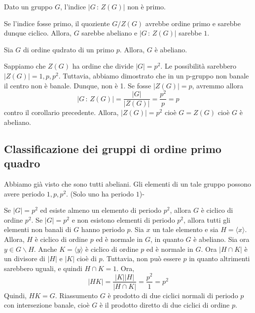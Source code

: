 \documentclass[a4paper]{article}
\begin{document}
\begin{snippetcorollary}{}
    Dato un gruppo \(G\), l'indice %
    \(|G\,:\,Z(G)|\) non è primo.
\end{snippetcorollary}

\begin{snippetproof}{}
    Se l'indice fosse primo, il quoziente \(G /Z(G)\) avrebbe ordine primo e sarebbe dunque ciclico.
    Allora, \(G\) sarebbe abeliano e \(|G\,:\,Z(G)|\) sarebbe \(1\).
\end{snippetproof}

\begin{snippetcorollary}{}
    Sia \(G\) di ordine qudrato di un primo \(p\).
    Allora, \(G\) è abeliano.
\end{snippetcorollary}

\begin{snippetproof}{}
    Sappiamo che \(Z(G)\) ha ordine che divide \(|G| = p^2\).
    Le possibilità sarebbero \(|Z(G)| = 1,p, p^2\).
    Tuttavia, abbiamo dimostrato che in un p-gruppo non banale
    il centro non è banale.
    Dunque, non è 1.
    Se fosse \(|Z(G)| = p\), avremmo allora
    \[
        |G\,:\, Z(G)| = \frac{|G|}{|Z(G)|} = \frac{p^2}{p} =p
    \]
    contro il corollario precedente.
    Allora, \(|Z(G)| = p^2\) cioè \(G = Z(G)\) cioè \(G\) è abeliano.
\end{snippetproof}


\subsection{Classificazione dei gruppi di ordine primo quadro}

Abbiamo già visto che sono tutti abeliani.
Gli elementi di un tale gruppo possono avere periodo \(1, p, p^2\). (Solo uno ha periodo \(1\))-

Se \(|G| = p^2\) ed esiste almeno un elemento di periodo
\(p^2\), allora \(G\) è ciclico di ordine \(p^2\).
Se \(|G| = p^2\) e non esistono elementi di periodo \(p^2\),
allora tutti gli elementi non banali di \(G\) hanno periodo \(p\).
Sia \(x\) un tale elemento e sia \(H = \langle x \rangle\).
Allora, \(H\) è ciclico di ordine \(p\) ed è normale in \(G\), in quanto \(G\) è abeliano.
Sia ora \(y \in G \backslash H\). Anche \(K = \langle y \rangle\)
è ciclico di ordine \(p\) ed è normale in \(G\).
Ora \(|H \cap K|\) è un divisore di \(|H|\) e \(|K|\)
cioè di \(p\). Tuttavia, non può essere \(p\) in quanto altrimenti sarebbero uguali,
e quindi \(H \cap K = 1\).
Ora,
\[
    |HK| = \frac{|K||H|}{|H \cap K|} = \frac{p^2}{1} = p^2
\]
Quindi, \(HK = G\).
Riassumento \(G\) è prodotto di due ciclici normali
di periodo \(p\) con intersezione banale,
cioè \(G\) è il prodotto diretto di due ciclici di ordine \(p\).
\end{document}
